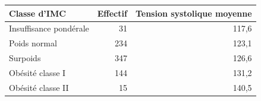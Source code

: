 \begin{tabular}{lrr}
\toprule
Classe d'IMC & Effectif & Tension systolique moyenne \\
\midrule
Insuffisance pondérale & 31 & 117,6 \\
Poids normal & 234 & 123,1 \\
Surpoids & 347 & 126,6 \\
Obésité classe I & 144 & 131,2 \\
Obésité classe II & 15 & 140,5 \\
\bottomrule
\end{tabular}

